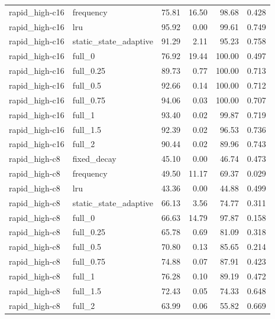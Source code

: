 \begin{longtable}{llrrrr}
rapid\_high-c16 & frequency & 75.81 & 16.50 & 98.68 & 0.428\\
rapid\_high-c16 & lru & 95.92 & 0.00 & 99.61 & 0.749\\
rapid\_high-c16 & static\_state\_adaptive & 91.29 & 2.11 & 95.23 & 0.758\\
rapid\_high-c16 & full\_0 & 76.92 & 19.44 & 100.00 & 0.497\\
rapid\_high-c16 & full\_0.25 & 89.73 & 0.77 & 100.00 & 0.713\\
rapid\_high-c16 & full\_0.5 & 92.66 & 0.14 & 100.00 & 0.712\\
rapid\_high-c16 & full\_0.75 & 94.06 & 0.03 & 100.00 & 0.707\\
rapid\_high-c16 & full\_1 & 93.40 & 0.02 & 99.87 & 0.719\\
rapid\_high-c16 & full\_1.5 & 92.39 & 0.02 & 96.53 & 0.736\\
rapid\_high-c16 & full\_2 & 90.44 & 0.02 & 89.96 & 0.743\\
rapid\_high-c8 & fixed\_decay & 45.10 & 0.00 & 46.74 & 0.473\\
rapid\_high-c8 & frequency & 49.50 & 11.17 & 69.37 & 0.029\\
rapid\_high-c8 & lru & 43.36 & 0.00 & 44.88 & 0.499\\
rapid\_high-c8 & static\_state\_adaptive & 66.13 & 3.56 & 74.77 & 0.311\\
rapid\_high-c8 & full\_0 & 66.63 & 14.79 & 97.87 & 0.158\\
rapid\_high-c8 & full\_0.25 & 65.78 & 0.69 & 81.09 & 0.318\\
rapid\_high-c8 & full\_0.5 & 70.80 & 0.13 & 85.65 & 0.214\\
rapid\_high-c8 & full\_0.75 & 74.88 & 0.07 & 87.91 & 0.423\\
rapid\_high-c8 & full\_1 & 76.28 & 0.10 & 89.19 & 0.472\\
rapid\_high-c8 & full\_1.5 & 72.43 & 0.05 & 74.33 & 0.648\\
rapid\_high-c8 & full\_2 & 63.99 & 0.06 & 55.82 & 0.669\\
\bottomrule\end{longtable}